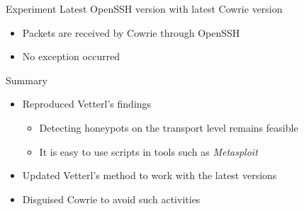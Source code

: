 \begin{frame}{Experiment}
Latest OpenSSH version with latest Cowrie version
    \begin{itemize}
        \item Packets are received by Cowrie through OpenSSH
        \item No exception occurred
    \end{itemize}
\end{frame}

\begin{frame}{Summary}
    \begin{itemize}
        \item Reproduced Vetterl's findings
        \begin{itemize}
            \item Detecting honeypots on the transport level remains feasible
            \item It is easy to use scripts in tools such as \textit{Metasploit}
        \end{itemize}
        \item Updated Vetterl's method to work with the latest versions
        \item Disguised Cowrie to avoid such activities
    \end{itemize}
\end{frame}